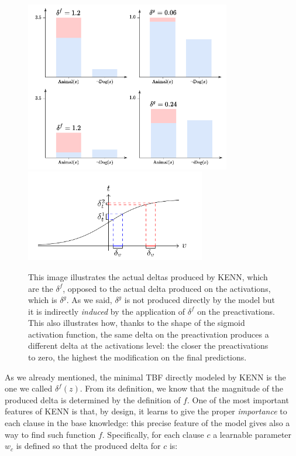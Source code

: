 \begin{figure}[h!]
	\centering
	\includegraphics[width=0.8\textwidth]{figures/preac_deltas_example.pdf}
	\includegraphics[width=0.7\textwidth]{figures/sigmoid_shape_example.png}
	\caption{This image illustrates the actual deltas produced by KENN, which are the $\delta^f$, opposed to the actual delta produced on the activations, which is $\delta^g$. As we said, $\delta^g$ is not produced directly by the model but it is indirectly \textit{induced} by the application of $\delta^f$ on the preactivations. This also illustrates how, thanks to the shape of the sigmoid activation function, the same delta on the preactivation produces a different delta at the activations level: the closer the preactivations to zero, the highest the modification on the final predictions. }
	\label{fig:preacs_deltas_example}
\end{figure}

As we already mentioned, the minimal TBF directly modeled by KENN is the one we called $\delta^f(z)$. From its definition, we know that the magnitude of the produced delta is determined by the definition of $f$. One of the most important features of KENN is that, by design, it learns to give the proper \textit{importance} to each clause in the base knowledge: this precise feature of the model gives also a way to find such function $f$. Specifically, for each clause $c$ a learnable parameter $w_c$ is defined so that the produced delta for $c$ is:

